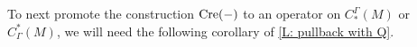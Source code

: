 To next promote the construction $\mathrm{Cre}(-)$ to an operator on $C_*^{\Gamma}(M)$ or $C^*_\Gamma(M)$, we will need the following corollary of \cref{L: pullback with Q}.

